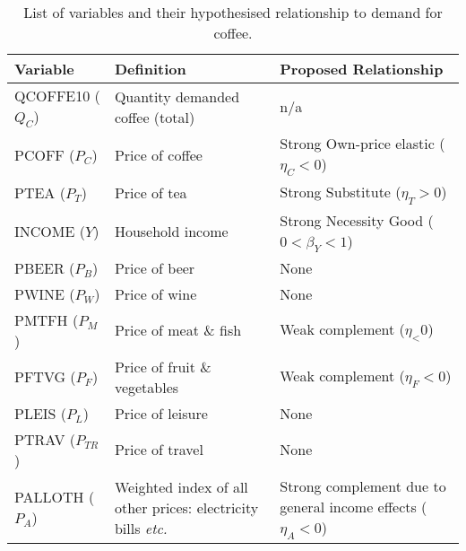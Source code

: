 \documentclass[12pt]{article}
\begin{document}
\begin{table}[!htb]

	\caption{\label{tb:sumstats} List of variables and their hypothesised relationship to demand for coffee.}

	\begin{tabularx}{\linewidth}{lXX}
	
    \textbf{Variable}  & \textbf{Definition}                                      & \textbf{Proposed Relationship}                          \\ \hline
	QCOFFE10 (\(Q_C\)) & Quantity demanded coffee (total) 					  & n/a 													\\
    PCOFF (\(P_C\))    & Price of coffee                                          & Strong Own-price elastic (\(\eta_C<0\))                                    \\
    PTEA  (\(P_T\))    & Price of tea                                             & Strong Substitute  (\(\eta_T>0\))                                      \\
    INCOME (\(Y\))     &  Household income 									   & Strong Necessity Good 	  (\(0<\beta_Y<1\))									\\
    PBEER (\(P_B\))    & Price of beer                                            & None                                      		   	   \\
    PWINE (\(P_W\))    & Price of wine                                            & None													\\
    PMTFH (\(P_M\))    & Price of meat \& fish                                    & Weak complement (\(\eta_<0\))                                   			 	 \\
    PFTVG (\(P_F\))    & Price of fruit \& vegetables                             & Weak complement   (\(\eta_F<0\))                                   		   	   \\
    PLEIS (\(P_L\))    & Price of leisure                                         & None                                     			 	 \\
    PTRAV (\(P_{TR}\)) & Price of travel                                          & None                                   			  	  \\
    PALLOTH (\(P_A\))  &  Weighted index of all other prices: electricity bills \emph{etc.}             & Strong complement due to general income effects (\(\eta_A<0\))  	 \\

	\end{tabularx}

\end{table} %
\end{document}
